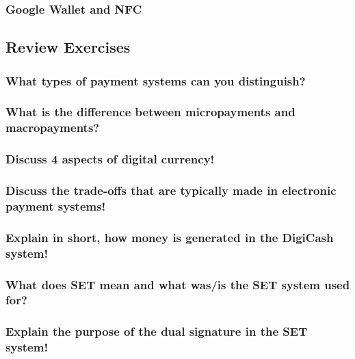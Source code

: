 \documentclass[a4paper, 10 pt, conference]{ieeeconf}
\begin{document}
\subsubsection{\textbf{Google Wallet and NFC}}


\subsection{\textbf{Review Exercises}}

\subsubsection{\textbf{What types of payment systems can you distinguish?}}

\subsubsection{\textbf{What is the difference between micropayments and macropayments?}}

\subsubsection{\textbf{Discuss 4 aspects of digital currency!}}

\subsubsection{\textbf{Discuss the trade-offs that are typically made in electronic payment systems!}}

\subsubsection{\textbf{Explain in short, how money is generated in the DigiCash system!}}

\subsubsection{\textbf{What does SET mean and what was/is the SET system used for?}}

\subsubsection{\textbf{Explain the purpose of the dual signature in the SET system!}}
\end{document}
